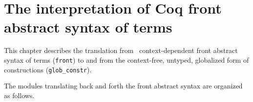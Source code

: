 
\newpage
\section*{The interpretation of Coq front abstract syntax of terms}

\ocwsection \label{interp}
This chapter describes the translation from \Coq\ context-dependent
front abstract syntax of terms (\verb=front=) to and from the
context-free, untyped, globalized form of constructions (\verb=glob_constr=).

The modules translating back and forth the front abstract syntax are
organized as follows.

\bigskip
\begin{center}\end{center}
